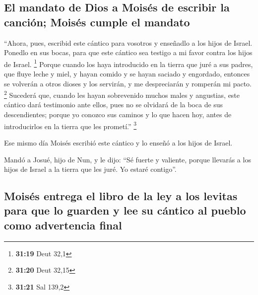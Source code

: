 \begin{paracol}{2}
\hypertarget{el-mandato-de-dios-a-moisuxe9s-de-escribir-la-canciuxf3n-moisuxe9s-cumple-el-mandato}{%
\subsection{El mandato de Dios a Moisés de escribir la canción; Moisés
cumple el
mandato}\label{el-mandato-de-dios-a-moisuxe9s-de-escribir-la-canciuxf3n-moisuxe9s-cumple-el-mandato}}

 ``Ahora, pues, escribid este cántico para vosotros y
enseñadlo a los hijos de Israel. Ponedlo en sus bocas, para que este
cántico sea testigo a mi favor contra los hijos de Israel. \footnote{\textbf{31:19}
  Deut 32,1}  Porque cuando los haya introducido en la
tierra que juré a sus padres, que fluye leche y miel, y hayan comido y
se hayan saciado y engordado, entonces se volverán a otros dioses y los
servirán, y me despreciarán y romperán mi pacto. \footnote{\textbf{31:20}
  Deut 32,15}  Sucederá que, cuando les hayan sobrevenido
muchos males y angustias, este cántico dará testimonio ante ellos, pues
no se olvidará de la boca de sus descendientes; porque yo conozco sus
caminos y lo que hacen hoy, antes de introducirlos en la tierra que les
prometí.'' \footnote{\textbf{31:21} Sal 139,2}

 Ese mismo día Moisés escribió este cántico y lo enseñó a
los hijos de Israel.

 Mandó a Josué, hijo de Nun, y le dijo: ``Sé fuerte y
valiente, porque llevarás a los hijos de Israel a la tierra que les
juré. Yo estaré contigo''.

\hypertarget{moisuxe9s-entrega-el-libro-de-la-ley-a-los-levitas-para-que-lo-guarden-y-lee-su-cuxe1ntico-al-pueblo-como-advertencia-final}{%
\subsection{Moisés entrega el libro de la ley a los levitas para que lo
guarden y lee su cántico al pueblo como advertencia
final}\label{moisuxe9s-entrega-el-libro-de-la-ley-a-los-levitas-para-que-lo-guarden-y-lee-su-cuxe1ntico-al-pueblo-como-advertencia-final}}


\end{paracol}
